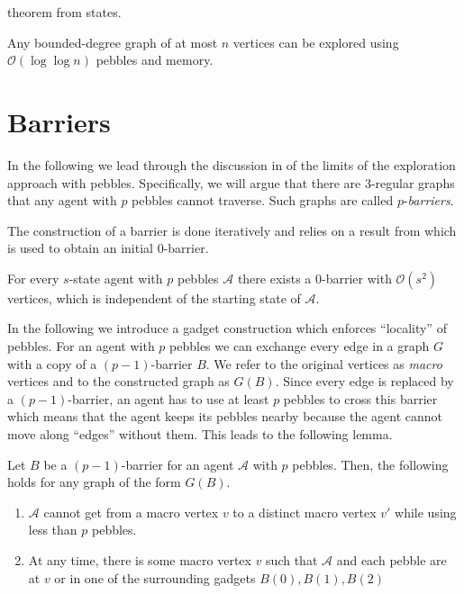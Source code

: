 theorem from \cite{pebbles} states.
\begin{thm}
  Any bounded-degree graph of at most $n$ vertices can be explored using
  $\mathcal{O}(\log \log n)$ pebbles and memory.
\end{thm}

\section{Barriers}
In the following we lead through the discussion in \cite{pebbles} of the limits
of the exploration approach with pebbles. Specifically, we will argue that
there are 3-regular graphs that any agent with $p$ pebbles cannot traverse.
Such graphs are called $p$-\emph{barriers}.

The construction of a barrier is done iteratively and relies on a result from
\citeauthor{0barrier} \cite{0barrier} which is used to obtain an initial
$0$-barrier.
\begin{lem}
  \label{lem:0bar}
  For every $s$-state agent with $p$ pebbles $\mathcal{A}$ there exists a
  $0$-barrier with $\mathcal{O}(s^{2})$ vertices, which is independent of
  the starting state of $\mathcal{A}$.
\end{lem}

In the following we introduce a gadget construction which enforces
\enquote{locality} of pebbles. For an agent with $p$ pebbles we can exchange
every edge in a graph $G$ with a copy of a $(p-1)$-barrier $B$. We refer to the
original vertices as \emph{macro} vertices and to the constructed graph as
$G(B)$.  Since every edge is replaced by a $(p-1)$-barrier, an agent has to use
at least $p$ pebbles to cross this barrier which means that the agent keeps its
pebbles nearby because the agent cannot move along \enquote{edges} without
them. This leads to the following lemma.
\begin{lem}
  \label{lem:loc}
  Let $B$ be a $(p-1)$-barrier for an agent $\mathcal{A}$ with $p$ pebbles.
  Then, the following holds for any graph of the form $G(B)$.
  \begin{enumerate}
    \item $\mathcal{A}$ cannot get from a macro vertex $v$ to a distinct
      macro vertex $v'$ while using less than $p$ pebbles.
    \item At any time, there is some macro vertex $v$ such that $\mathcal{A}$
      and each pebble are at $v$ or in one of the surrounding gadgets $B(0),
      B(1), B(2)$
  \end{enumerate}
\end{lem}

